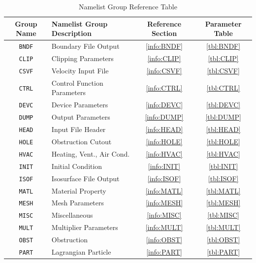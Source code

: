 \documentclass[11pt]{book}
\newcommand{\ct}{\tt\small}
\begin{document}
\vspace{\baselineskip}
\begin{table}[ht]
\begin{center}
\caption{Namelist Group Reference Table}
\label{tbl:namelistgroups}
\begin{tabular}{|c|l|c|c|}
\hline
Group Name  & Namelist Group Description& Reference Section & Parameter Table  \\ \hline
{\ct BNDF}  & Boundary File Output         & \ref{info:BNDF} & \ref{tbl:BNDF}  \\ \hline
{\ct CLIP}  & Clipping Parameters          & \ref{info:CLIP} & \ref{tbl:CLIP}  \\ \hline
{\ct CSVF}  & Velocity Input File          & \ref{info:CSVF} & \ref{tbl:CSVF}  \\ \hline
{\ct CTRL}  & Control Function Parameters  & \ref{info:CTRL} & \ref{tbl:CTRL}  \\ \hline
{\ct DEVC}  & Device Parameters            & \ref{info:DEVC} & \ref{tbl:DEVC}  \\ \hline
{\ct DUMP}  & Output Parameters            & \ref{info:DUMP} & \ref{tbl:DUMP}  \\ \hline
{\ct HEAD}  & Input File Header            & \ref{info:HEAD} & \ref{tbl:HEAD}  \\ \hline
{\ct HOLE}  & Obstruction Cutout           & \ref{info:HOLE} & \ref{tbl:HOLE}  \\ \hline
{\ct HVAC}  & Heating, Vent., Air Cond.    & \ref{info:HVAC} & \ref{tbl:HVAC}  \\ \hline
{\ct INIT}  & Initial Condition            & \ref{info:INIT} & \ref{tbl:INIT}  \\ \hline
{\ct ISOF}  & Isosurface File Output       & \ref{info:ISOF} & \ref{tbl:ISOF}  \\ \hline
{\ct MATL}  & Material Property            & \ref{info:MATL} & \ref{tbl:MATL}  \\ \hline
{\ct MESH}  & Mesh Parameters              & \ref{info:MESH} & \ref{tbl:MESH}  \\ \hline
{\ct MISC}  & Miscellaneous                & \ref{info:MISC} & \ref{tbl:MISC}  \\ \hline
{\ct MULT}  & Multiplier Parameters        & \ref{info:MULT} & \ref{tbl:MULT}  \\ \hline
{\ct OBST}  & Obstruction                  & \ref{info:OBST} & \ref{tbl:OBST}  \\ \hline
{\ct PART}  & Lagrangian Particle          & \ref{info:PART} & \ref{tbl:PART}  \\ \hline

\end{tabular}
\end{center}
\end{table}
\end{document}
